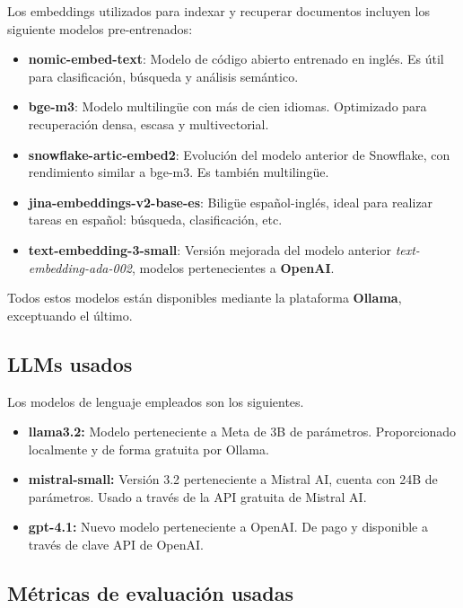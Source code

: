             Los embeddings utilizados para indexar y recuperar documentos incluyen los siguiente modelos pre-entrenados:

            \begin{itemize}
                \item \textbf{nomic-embed-text}: Modelo de código abierto entrenado en inglés. Es útil para clasificación, búsqueda y análisis semántico.
                \item \textbf{bge-m3}: Modelo multilingüe con más de cien idiomas. Optimizado para recuperación densa, escasa y multivectorial.
                \item \textbf{snowflake-artic-embed2}: Evolución del modelo anterior de Snowflake, con rendimiento similar a bge-m3. Es también multilingüe.
                \item \textbf{jina-embeddings-v2-base-es}: Biligüe español-inglés, ideal para realizar tareas en español: búsqueda, clasificación, etc.
                \item \textbf{text-embedding-3-small}: Versión mejorada del modelo anterior \textit{text-embedding-ada-002}, modelos pertenecientes a \textbf{OpenAI}.
            \end{itemize}

            \noindent Todos estos modelos están disponibles mediante la plataforma \textbf{Ollama}, exceptuando el último.

        \subsection{LLMs usados}

            Los modelos de lenguaje empleados son los siguientes.

            \begin{itemize}
                \item \textbf{llama3.2:} Modelo perteneciente a Meta de 3B de parámetros. Proporcionado localmente y de forma gratuita por Ollama.
                \item \textbf{mistral-small:} Versión 3.2 perteneciente a Mistral AI, cuenta con 24B de parámetros. Usado a través de la API gratuita de Mistral AI.
                \item \textbf{gpt-4.1:} Nuevo modelo perteneciente a OpenAI. De pago y disponible a través de clave API de OpenAI.
            \end{itemize}

        \subsection{Métricas de evaluación usadas}

